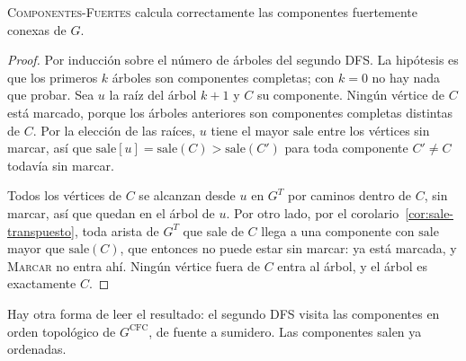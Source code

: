 \documentclass[11pt,letterpaper]{article}
\begin{document}
\begin{teorema}
  \label{teo:componentes-fuertes}
  {\upshape\textsc{Componentes-Fuertes}} calcula correctamente las
  componentes fuertemente conexas de $G$.
\end{teorema}

\begin{proof}
  Por inducción sobre el número de árboles del segundo DFS. La
  hipótesis es que los primeros $k$ árboles son componentes completas;
  con $k = 0$ no hay nada que probar. Sea $u$ la raíz del árbol
  $k + 1$ y $C$ su componente. Ningún vértice de $C$ está marcado,
  porque los árboles anteriores son componentes completas distintas de
  $C$. Por la elección de las raíces, $u$ tiene el mayor $\text{sale}$
  entre los vértices sin marcar, así que
  $\text{sale}[u] = \text{sale}(C) > \text{sale}(C')$ para toda
  componente $C' \neq C$ todavía sin marcar.

  Todos los vértices de $C$ se alcanzan desde $u$ en $G^T$ por caminos
  dentro de $C$, sin marcar, así que quedan en el árbol de $u$. Por
  otro lado, por el corolario~\ref{cor:sale-transpuesto}, toda arista
  de $G^T$ que sale de $C$ llega a una componente con $\text{sale}$
  mayor que $\text{sale}(C)$, que entonces no puede estar sin marcar:
  ya está marcada, y \textsc{Marcar} no entra ahí. Ningún vértice fuera
  de $C$ entra al árbol, y el árbol es exactamente $C$.
\end{proof}

Hay otra forma de leer el resultado: el segundo DFS visita las
componentes en orden topológico de $G^{\text{CFC}}$, de fuente a
sumidero. Las componentes salen ya ordenadas.
\end{document}
